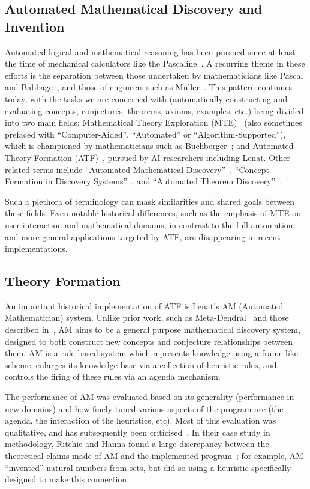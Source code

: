 \subsection{Automated Mathematical Discovery and Invention}

Automated logical and mathematical reasoning has been pursued since at least the
time of mechanical calculators like the Pascaline~\cite{d'ocagne}. A
recurring theme in these efforts is the separation between those undertaken by
mathematicians like Pascal and Babbage~\cite{bowden}, and those of engineers
such as M\"uller~\cite[p. 65]{lindgren}. This pattern continues today, with the
tasks we are concerned with (automatically constructing and evaluating concepts,
conjectures, theorems, axioms, examples, etc.) being divided into two main
fields: Mathematical Theory Exploration (MTE)~\cite{buchberger:06} (also
sometimes prefaced with ``Computer-Aided'', ``Automated'' or
``Algorithm-Supported''), which is championed by mathematicians such as
Buchberger~\cite{buchberger}; and Automated Theory Formation
(ATF)~\cite{lenat:77,colton:book}, pursued by AI researchers including Lenat.
Other related terms include ``Automated Mathematical
Discovery''~\cite{epstein:91,colton2000notion,esarm2008},
``Concept Formation in Discovery Systems''~\cite{haase}, and
``Automated Theorem Discovery''~\cite{roy}.

Such a plethora of terminology can mask similarities and shared goals between
these fields. Even notable historical differences, such as the emphasis of MTE
on user-interaction and mathematical domains, in contrast to the full automation
and more general applications targeted by ATF, are disappearing in recent
implementations.

\subsection{Theory Formation}

An important historical implementation of ATF is Lenat's AM (Automated
Mathematician) system. Unlike prior work, such as
Meta-Dendral~\cite{buchanan:75} and those described in~\cite{winston}, AM aims
to be a general purpose mathematical discovery system, designed to both
construct new concepts and conjecture relationships between them. AM is a
rule-based system which represents knowledge using a frame-like scheme, enlarges
its knowledge base via a collection of heuristic rules, and controls the firing
of these rules via an agenda mechanism.

The performance of AM was evaluated based on its generality (performance in new
domains) and how finely-tuned various aspects of the program are (the agenda,
the interaction of the heuristics, etc). Most of this evaluation was
qualitative, and has subsequently been criticised~\cite[chap.~13]{colton:book}.
In their case study in methodology, Ritchie and Hanna found a large discrepancy
between the theoretical claims made of AM and the implemented
program~\cite{ritchie1984case}; for example, AM ``invented'' natural numbers
from sets, but did so using a heuristic specifically designed to make this
connection.

